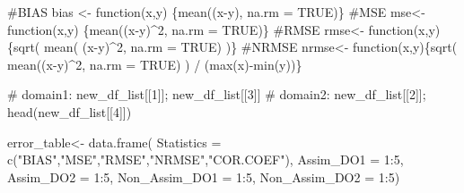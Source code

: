 \documentclass[
  letterpaper,
  DIV=11,
  numbers=noendperiod,
  abstract]{scrartcl}
\newenvironment{Shaded}{\begin{snugshade}}{\end{snugshade}}
\newcommand{\AttributeTok}[1]{\textcolor[rgb]{0.40,0.45,0.13}{#1}}
\newcommand{\CommentTok}[1]{\textcolor[rgb]{0.37,0.37,0.37}{#1}}
\newcommand{\ConstantTok}[1]{\textcolor[rgb]{0.56,0.35,0.01}{#1}}
\newcommand{\ControlFlowTok}[1]{\textcolor[rgb]{0.00,0.23,0.31}{#1}}
\newcommand{\DecValTok}[1]{\textcolor[rgb]{0.68,0.00,0.00}{#1}}
\newcommand{\FunctionTok}[1]{\textcolor[rgb]{0.28,0.35,0.67}{#1}}
\newcommand{\NormalTok}[1]{\textcolor[rgb]{0.00,0.23,0.31}{#1}}
\newcommand{\OtherTok}[1]{\textcolor[rgb]{0.00,0.23,0.31}{#1}}
\newcommand{\SpecialCharTok}[1]{\textcolor[rgb]{0.37,0.37,0.37}{#1}}
\newcommand{\StringTok}[1]{\textcolor[rgb]{0.13,0.47,0.30}{#1}}
\begin{document}
\begin{Shaded}
\begin{Highlighting}[]
\CommentTok{\#BIAS}
\NormalTok{bias }\OtherTok{\textless{}{-}} \ControlFlowTok{function}\NormalTok{(x,y) \{}\FunctionTok{mean}\NormalTok{((x}\SpecialCharTok{{-}}\NormalTok{y), }\AttributeTok{na.rm =} \ConstantTok{TRUE}\NormalTok{)\}}
\CommentTok{\#MSE}
\NormalTok{mse}\OtherTok{\textless{}{-}} \ControlFlowTok{function}\NormalTok{(x,y) \{}\FunctionTok{mean}\NormalTok{((x}\SpecialCharTok{{-}}\NormalTok{y)}\SpecialCharTok{\^{}}\DecValTok{2}\NormalTok{, }\AttributeTok{na.rm =} \ConstantTok{TRUE}\NormalTok{)\}}
\CommentTok{\#RMSE}
\NormalTok{rmse}\OtherTok{\textless{}{-}} \ControlFlowTok{function}\NormalTok{(x,y) \{}\FunctionTok{sqrt}\NormalTok{( }\FunctionTok{mean}\NormalTok{( (x}\SpecialCharTok{{-}}\NormalTok{y)}\SpecialCharTok{\^{}}\DecValTok{2}\NormalTok{, }\AttributeTok{na.rm =} \ConstantTok{TRUE}\NormalTok{) )\}}
\CommentTok{\#NRMSE}
\NormalTok{nrmse}\OtherTok{\textless{}{-}} \ControlFlowTok{function}\NormalTok{(x,y)\{}\FunctionTok{sqrt}\NormalTok{( }\FunctionTok{mean}\NormalTok{((x}\SpecialCharTok{{-}}\NormalTok{y)}\SpecialCharTok{\^{}}\DecValTok{2}\NormalTok{, }\AttributeTok{na.rm =} \ConstantTok{TRUE}\NormalTok{) ) }\SpecialCharTok{/}\NormalTok{ (}\FunctionTok{max}\NormalTok{(x)}\SpecialCharTok{{-}}\FunctionTok{min}\NormalTok{(y))\}}


\CommentTok{\# domain1: new\_df\_list[[1]]; new\_df\_list[[3]]}
\CommentTok{\# domain2: new\_df\_list[[2]]; head(new\_df\_list[[4]])}

\NormalTok{error\_table}\OtherTok{\textless{}{-}} \FunctionTok{data.frame}\NormalTok{(}
                   \AttributeTok{Statistics =} \FunctionTok{c}\NormalTok{(}\StringTok{"BIAS"}\NormalTok{,}\StringTok{"MSE"}\NormalTok{,}\StringTok{"RMSE"}\NormalTok{,}\StringTok{"NRMSE"}\NormalTok{,}\StringTok{"COR.COEF"}\NormalTok{), }
                   \AttributeTok{Assim\_DO1 =} \DecValTok{1}\SpecialCharTok{:}\DecValTok{5}\NormalTok{, }
                   \AttributeTok{Assim\_DO2 =} \DecValTok{1}\SpecialCharTok{:}\DecValTok{5}\NormalTok{, }
                   \AttributeTok{Non\_Assim\_DO1 =} \DecValTok{1}\SpecialCharTok{:}\DecValTok{5}\NormalTok{,   }
                   \AttributeTok{Non\_Assim\_DO2 =} \DecValTok{1}\SpecialCharTok{:}\DecValTok{5}\NormalTok{)}



\end{Highlighting}
\end{Shaded}
\end{document}
